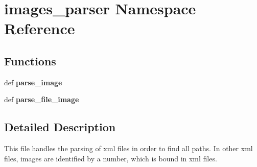 \hypertarget{namespaceimages__parser}{\section{images\-\_\-parser \-Namespace \-Reference}
\label{namespaceimages__parser}
}
\subsection*{\-Functions}
\begin{DoxyCompactItemize}
\item 
\hypertarget{namespaceimages__parser_a53ce946b0b782dbe0ddfae847a7c4779}{def {\bfseries parse\-\_\-image}}\label{namespaceimages__parser_a53ce946b0b782dbe0ddfae847a7c4779}

\item 
\hypertarget{namespaceimages__parser_a015beb8e8eab0e7427bc23a472f4a0e3}{def {\bfseries parse\-\_\-file\-\_\-image}}\label{namespaceimages__parser_a015beb8e8eab0e7427bc23a472f4a0e3}

\end{DoxyCompactItemize}


\subsection{\-Detailed \-Description}
\begin{DoxyVerb}
This file handles the parsing of xml files in order to find all paths.
In other xml files, images are identified by a number, which is bound
in xml files.
\end{DoxyVerb}
 